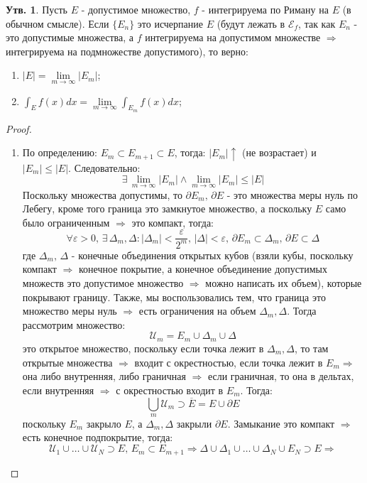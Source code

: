 \documentclass[12pt]{article}
\newcommand{\MU}{\mathcal{U}}
\newcommand{\ME}{\mathcal{E}}
\newcommand{\VE}{\varepsilon}
\theoremstyle{definition}
\newtheorem{prop}{Утв.}
\newcommand{\ovl}[1]{\overline{#1}}
\begin{document}
\begin{prop}
	Пусть $E$ - допустимое множество, $f$ - интегрируема по Риману на $E$ (в обычном смысле). Если $\{E_n\}$ это исчерпание $E$ (будут лежать в $\ME_f$, так как $E_n$ - это допустимые множества, а $f$ интегрируема на допустимом множестве $\Rightarrow$ интегрируема на подмножестве допустимого), то верно:
	\begin{enumerate}[label=\arabic*)]
		\item $|E| = \lim\limits_{m \to \infty}|E_m|$;
		\item $\int_{E}f(x)dx = \lim\limits_{m \to \infty}\int_{E_m}f(x)dx$;
	\end{enumerate}
\end{prop}
\begin{proof}\hfill
	\begin{enumerate}[label=\arabic*)]
		\item По определению: $E_m \subset E_{m+1} \subset E$, тогда: $|E_m| \uparrow$ (не возрастает) и $|E_m|\leq |E|$. Следовательно:
		$$
			\exists \, \lim\limits_{m \to \infty}|E_m| \wedge  \lim\limits_{m \to \infty}|E_m|\leq |E|
		$$
		Поскольку множества допустимы, то $\partial E_m, \, \partial E$ - это множества меры нуль по Лебегу, кроме того граница это замкнутое множество, а поскольку $E$ само было ограниченным $\Rightarrow$ это компакт, тогда:
		$$
			\forall \VE > 0, \, \exists \, \Delta_m, \Delta \colon |\Delta_m| < \dfrac{\VE}{2^m}, \, |\Delta| < \VE, \, \partial E_m \subset \Delta_m, \, \partial E \subset \Delta
		$$
		где $\Delta_m, \, \Delta$ - конечные объединения открытых кубов (взяли кубы, поскольку компакт $\Rightarrow$ конечное покрытие, а конечное объединение допустимых множеств это допустимое множество $\Rightarrow$ можно написать их объем), которые покрывают границу. Также, мы воспользовались тем, что граница это множество меры нуль $\Rightarrow$ есть ограничения на объем $\Delta_m, \Delta$. Тогда рассмотрим множество: 
		$$
			\MU_m = E_m \cup \Delta_m \cup \Delta
		$$  
		это открытое множество, поскольку если точка лежит в $\Delta_m, \Delta$, то там открытые множества $\Rightarrow$ входит с окрестностью, если точка лежит в $E_m \Rightarrow$ она либо внутренняя, либо граничная $\Rightarrow$ если граничная, то она в дельтах, если внутренняя $\Rightarrow$ с окрестностью входит в $E_m$. Тогда:
		$$
			\bigcup\limits_m \MU_m \supset \ovl{E} = E \cup \partial E
		$$
		поскольку $E_m$ закрыло $E$, а $\Delta_m, \Delta$ закрыли $\partial E$. Замыкание это компакт $\Rightarrow$ есть конечное подпокрытие, тогда:
		$$
			\MU_1 \cup \dotsc \cup \MU_N \supset E, \, E_m \subset E_{m+1} \Rightarrow \Delta \cup \Delta_1 \cup \dotsc \cup \Delta_N \cup E_N \supset E \Rightarrow 
$$
\end{enumerate}
\end{proof}
\end{document}
